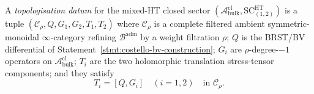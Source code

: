 \begin{defn}\label{defn:topologisation-datum}
A \emph{topologisation datum} for the mixed-HT closed sector
\((\mathcal A^{\mathrm{cl}}_{\mathrm{bulk}},
\mathrm{SC}^{\mathrm{HT}}_{(1,2)})\) is a tuple
\((\mathcal C_\rho,Q,G_1,G_2,T_1,T_2)\) where
\(\mathcal C_\rho\) is a complete filtered ambient
symmetric-monoidal \(\infty\)-category refining
\(\mathcal B^{\mathrm{adm}}\) by a weight filtration \(\rho\); \(Q\) is
the BRST/BV differential of
Statement~\ref{stmt:costello-bv-construction}; \(G_i\) are
\(\rho\)-degree-\(-1\) operators on
\(\mathcal A^{\mathrm{cl}}_{\mathrm{bulk}}\); \(T_i\) are the two
holomorphic translation stress-tensor components; and they satisfy
\begin{equation}\label{eq:stress-tensor-null-homotopy}
  T_i=[Q,G_i]\quad(i=1,2)\quad\text{in }\mathcal C_\rho.
\end{equation}
\end{defn}

